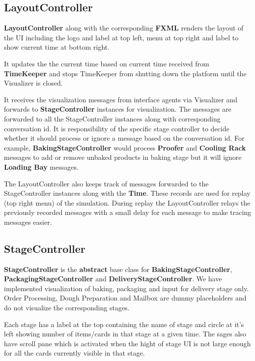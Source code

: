 \documentclass[12pt]{article}
\begin{document}
\subsection{LayoutController}
\textbf{LayoutController} along with the corresponding \textbf{FXML} renders the layout of the UI including the logo and label at top left, menu at top right and label to show current time at bottom right.

It updates the the current time based on current time received from \textbf{TimeKeeper} and stops TimeKeeper from shutting down the platform until the Visualizer is closed.

It receives the visualization messages from interface agents via Visualizer and forwards to \textbf{StageController} instances for visualization. The messages are forwarded to all the StageController instances along with corresponding conversation id. It is responsibility of the specific stage controller to decide whether it should process or ignore a message based on the conversation id. For example, \textbf{BakingStageController} would process \textbf{Proofer} and \textbf{Cooling Rack} messages to add or remove unbaked products in baking stage but it will ignore \textbf{Loading Bay} messages.

The LayoutController also keeps track of messages forwarded to the StageController instances along with the \textbf{Time}. These records are used for replay (top right menu) of the simulation. During replay the LayoutController relays the previously recorded messages with a small delay for each message to make tracing messages easier.

\subsection{StageController}
\textbf{StageController} is the \textbf{abstract} base class for \textbf{BakingStageController}, \textbf{PackagingStageController} and \textbf{DeliveryStageController}. We have implemented visualization of baking, packaging and input for delivery stage only. Order Processing, Dough Preparation and Mailbox are dummy placeholders and do not visualize the corresponding stages.

Each stage has a label at the top containing the name of stage and circle at it's left showing number of items/cards in that stage at a given time. The sages also have scroll pane which is activated when the hight of stage UI is not large enough for all the cards currently visible in that stage.
\end{document}
